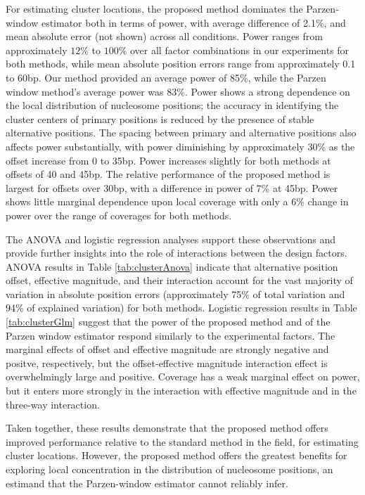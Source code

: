 For estimating cluster locations, the proposed method dominates the Parzen-window estimator both in terms of power, with average difference of 2.1\%, and mean absolute error (not shown) across all conditions.
Power ranges from approximately $12\%$ to $100\%$ over all factor combinations in our experiments for both methods, while mean absolute position errors range from approximately 0.1 to 60bp.
Our method provided an average power of 85\%, while the Parzen window method's average power was 83\%.
Power shows a strong dependence on the local distribution of nucleosome positions; the accuracy in identifying the cluster centers of primary positions is reduced by the presence of stable alternative positions.
The spacing between primary and alternative positions also affects power substantially, with power diminishing by approximately 30\% as the offset increase from 0 to 35bp.
Power increases slightly for both methods at offsets of 40 and 45bp.
The relative performance of the proposed method is largest for offsets over 30bp, with a difference in power of 7\% at 45bp.
Power shows little marginal dependence upon local coverage with only a 6\% change in power over the range of coverages for both methods.

The ANOVA and logistic regression analyses support these observations and provide further insights into the role of interactions between the design factors.
ANOVA results in Table \ref{tab:clusterAnova} indicate that alternative position offset, effective magnitude, and their interaction account for the vast majority of variation in absolute position errors (approximately 75\% of total variation and 94\% of explained variation) for both methods.
Logistic regression results in Table \ref{tab:clusterGlm} suggest that the power of the proposed method and of the Parzen window estimator respond similarly to the experimental factors.
The marginal effects of offset and effective magnitude are strongly negative and positve, respectively, but the offset-effective magnitude interaction effect is overwhelmingly large and positive.
Coverage has a weak marginal effect on power, but it enters more strongly in the interaction with effective magnitude and in the three-way interaction.

Taken together, these results demonstrate that the proposed method offers improved performance relative to the standard method in the field, for estimating cluster locations.
However, the proposed method offers the greatest benefits for exploring  local concentration in the distribution of nucleosome positions, an estimand that the Parzen-window estimator cannot reliably infer.

